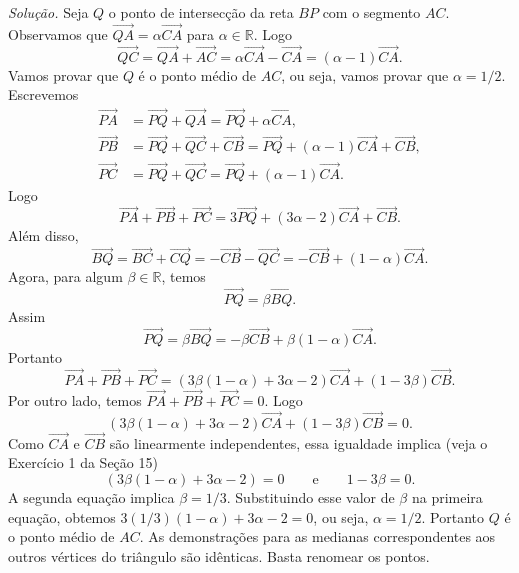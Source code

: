 \documentclass[a4paper,11pt]{article}
\newcommand{\R}{\mathbb{R}}
\begin{document}
\emph{Solução.}
Seja $Q$ o ponto de intersecção da reta $BP$ com o segmento $AC$.
Observamos que $\overrightarrow{QA} = \alpha \overrightarrow{CA}$ para $\alpha \in \R$.
Logo
\[
  \overrightarrow{QC} = \overrightarrow{QA} + \overrightarrow{AC} = \alpha \overrightarrow{CA} - \overrightarrow{CA} = (\alpha - 1) \overrightarrow{CA}.
\]
Vamos provar que $Q$ é o ponto médio de $AC$, ou seja, vamos provar que $\alpha = 1/2$.
Escrevemos
\begin{align*}
  \overrightarrow{PA} & = \overrightarrow{PQ} + \overrightarrow{QA} = \overrightarrow{PQ} + \alpha \overrightarrow{CA}, \\
  \overrightarrow{PB} & = \overrightarrow{PQ} + \overrightarrow{QC} + \overrightarrow{CB} = \overrightarrow{PQ} + (\alpha - 1) \overrightarrow{CA} + \overrightarrow{CB}, \\
  \overrightarrow{PC} & = \overrightarrow{PQ} + \overrightarrow{QC} = \overrightarrow{PQ} + (\alpha - 1) \overrightarrow{CA}.
\end{align*}
Logo
\[
  \overrightarrow{PA} + \overrightarrow{PB} + \overrightarrow{PC} = 3 \overrightarrow{PQ} + (3\alpha - 2) \overrightarrow{CA} + \overrightarrow{CB}.
\]
Além disso,
\[
  \overrightarrow{BQ} = \overrightarrow{BC} + \overrightarrow{CQ} = - \overrightarrow{CB} - \overrightarrow{QC} = - \overrightarrow{CB} + (1 - \alpha) \overrightarrow{CA}.
\]
Agora, para algum $\beta \in \R$, temos
\[
  \overrightarrow{PQ} = \beta \overrightarrow{BQ}.
\]
Assim
\[
  \overrightarrow{PQ} = \beta \overrightarrow{BQ} = - \beta \overrightarrow{CB} + \beta (1 - \alpha) \overrightarrow{CA}.
\]
Portanto
\[
  \overrightarrow{PA} + \overrightarrow{PB} + \overrightarrow{PC} = (3 \beta (1 - \alpha) + 3\alpha - 2) \overrightarrow{CA} + (1 - 3 \beta) \overrightarrow{CB}.
\]
Por outro lado, temos $\overrightarrow{PA} + \overrightarrow{PB} + \overrightarrow{PC} = 0$.
Logo
\[
  (3 \beta (1 - \alpha) + 3\alpha - 2) \overrightarrow{CA} + (1 - 3 \beta) \overrightarrow{CB} = 0.
\]
Como $\overrightarrow{CA}$ e $\overrightarrow{CB}$ são linearmente independentes, essa igualdade implica
(veja o Exercício 1 da Seção 15)
\[
  (3 \beta(1 - \alpha) + 3\alpha - 2) = 0 \qquad \text{e} \qquad 1 - 3 \beta = 0.
\]
A segunda equação implica $\beta = 1/3$.
Substituindo esse valor de $\beta$ na primeira equação, obtemos $3(1/3)(1 - \alpha) + 3\alpha - 2 = 0$, ou seja, $\alpha = 1/2$.
Portanto $Q$ é o ponto médio de $AC$.
As demonstrações para as medianas correspondentes aos outros vértices do triângulo são idênticas.
Basta renomear os pontos.
\end{document}
